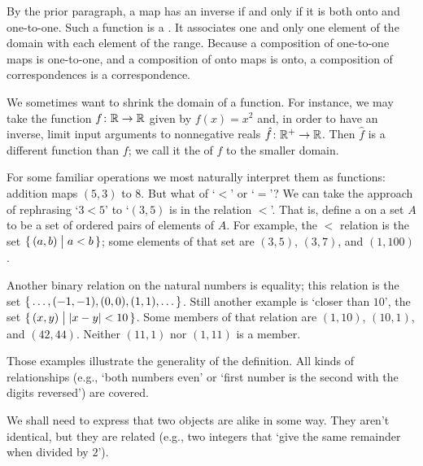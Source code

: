 By the prior paragraph, a map has an inverse if and only if it is both
onto and one-to-one. 
Such a function is a 
.
It associates one and only one element of the domain with each element of the
range.
Because a composition of one-to-one maps is one-to-one, and a composition
of onto maps is onto, a composition of correspondences is a
correspondence.

We sometimes want to shrink the domain of a function.
For instance, we may take the function \( \mbox{$f\colon \mathbb{R}\to \mathbb{R}$} \) given by
\( f(x)=x^2 \) and, in order to have an inverse, limit input arguments to
nonnegative reals \( \mbox{$\hat{f}\colon \mathbb{R}^+\to \mathbb{R}$} \).
Then \( \hat{f} \) is a different function than \( f \); we call it
the  of
\( f \) to the smaller domain.








For some familiar operations we most naturally interpret them as functions:
addition maps \( (5,3) \) to \( 8 \).
But what of `\( < \)' or `\( = \)'?
We can take the approach of rephrasing `\( 3<5 \)' to `\( (3,5) \) is
in the relation \( < \)'.
That is, define a  on a set \( A \) to be
a set of ordered pairs of elements of \( A \).
For example, the \( < \) relation is the set
\(  \mbox{$\{\,(a,b)\bigm| a<b\,\}$} \); some elements of that set are
\( (3,5) \), \( (3,7) \), and \( (1,100) \).

Another binary relation on the natural numbers is equality; this relation is
the set
\( \mbox{$\{\,\ldots,(-1,-1),(0,0),(1,1),\ldots\,\}$} \).
Still another example is `closer than \( 10 \)', the set
\( \mbox{$\{\,(x,y)\bigm| |x-y|<10 \,\}$} \).
Some members of that relation are \( (1,10) \), \( (10,1) \),
and \( (42,44) \).
Neither \( (11,1) \) nor \( (1,11) \) is a member.

Those examples illustrate the generality of the definition.
All kinds of relationships (e.g., `both numbers
even' or `first number is the second with the digits reversed')
are covered.




We shall need to express that two objects are alike in some way.
They aren't identical, but they are related
(e.g., two integers that `give the same remainder when divided by \( 2 \)').

